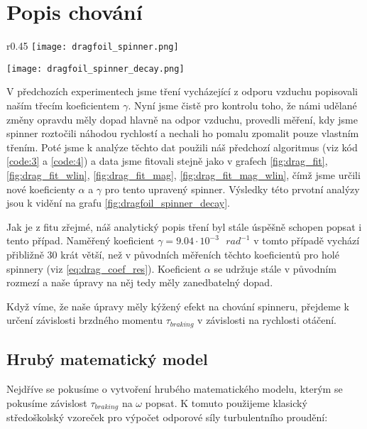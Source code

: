 \clearpage

\section{Popis chování}

\begin{wrapfigure}{r}{0.45\textwidth}
    \vspace{-1cm}
    \texttt{[image: dragfoil\_spinner.png]}
    \centering
    \caption{Spinner upravený k měření přenášeného momentu síly.}
    \label{fig:dragfoil_spinner}

    \vspace{1cm}
    \texttt{[image: dragfoil\_spinner\_decay.png]}
    \centering
    \caption{Výsledky měření k určení třecích koeficientů spinneru.}
    \label{fig:dragfoil_spinner_decay}
\end{wrapfigure}

V předchozích experimentech jsme tření vycházející z odporu vzduchu popisovali naším třecím koeficientem $\gamma$. Nyní jsme čistě pro kontrolu toho, že námi udělané změny opravdu měly dopad hlavně na odpor vzduchu, provedli měření, kdy jsme spinner roztočili  náhodou rychlostí a nechali ho pomalu zpomalit pouze vlastním třením. Poté jsme k analýze těchto dat použili náš předchozí algoritmus (viz kód \ref{code:3} a \ref{code:4}) a data jsme fitovali stejně jako v grafech \ref{fig:drag_fit}, \ref{fig:drag_fit_wlin}, \ref{fig:drag_fit_mag}, \ref{fig:drag_fit_mag_wlin}, čímž jsme určili nové koeficienty $\alpha$ a $\gamma$ pro tento upravený spinner. Výsledky této prvotní analýzy jsou k vidění na grafu \ref{fig:dragfoil_spinner_decay}.

Jak je z fitu zřejmé, náš analytický popis tření byl stále úspěšně schopen popsat i tento případ. Naměřený koeficient $\gamma = 9.04\cdot10^{-3} \text{ } rad^{-1}$ v tomto případě vychází přibližně 30 krát větší, než v původních měřeních těchto koeficientů pro holé spinnery (viz \autoref{eq:drag_coef_res}). Koeficient $\alpha$ se udržuje stále v původním rozmezí a naše úpravy na něj tedy měly zanedbatelný dopad.

Když víme, že naše úpravy měly kýžený efekt na chování spinneru, přejdeme k určení závislosti brzdného momentu $\tau_{braking}$ v závislosti na rychlosti otáčení.

{
    \raggedright
    \subsection{Hrubý matematický model}
    Nejdříve se pokusíme o vytvoření hrubého matematického modelu, kterým se pokusíme závislost $\tau_{braking}$ na $\omega$ popsat. K tomuto použijeme klasický středoškolský vzoreček pro výpočet odporové síly turbulentního proudění:
}


